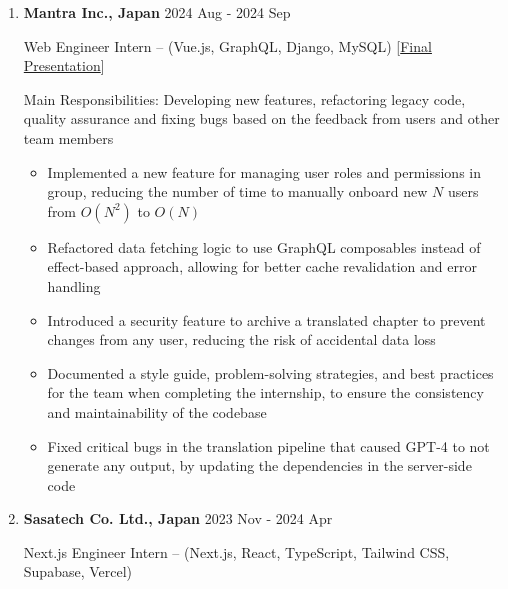 \documentclass[
  a4paper,
  10pt,
  dvipdfmx
]{article}
\begin{document}
\begin{enumerate}[]
  \item \textbf{Mantra Inc., Japan} \hfill 2024 Aug - 2024 Sep

        Web Engineer Intern -- (Vue.js, GraphQL, Django, MySQL) [\href{https://mantra-present.vercel.app/1}{Final Presentation}]

        Main Responsibilities: Developing new features, refactoring legacy code, quality assurance and fixing bugs based on the feedback from users and other team members

        \begin{itemize}
          \item Implemented a new feature for managing user roles and permissions in group, reducing the number of time to manually onboard new $N$ users from $O(N^2)$ to $O(N)$
          \item Refactored data fetching logic to use GraphQL composables instead of effect-based approach, allowing for better cache revalidation and error handling
          \item Introduced a security feature to archive a translated chapter to prevent changes from any user, reducing the risk of accidental data loss
          \item Documented a style guide, problem-solving strategies, and best practices
                for the team when completing the internship, to ensure the consistency and maintainability of the codebase
          \item Fixed critical bugs in the translation pipeline that caused GPT-4 to not generate any output, by updating the dependencies in the server-side code
        \end{itemize}

  \item \textbf{Sasatech Co. Ltd., Japan} \hfill 2023 Nov - 2024 Apr


        Next.js Engineer Intern -- (Next.js, React, TypeScript, Tailwind CSS, Supabase, Vercel)


\end{enumerate}
\end{document}
